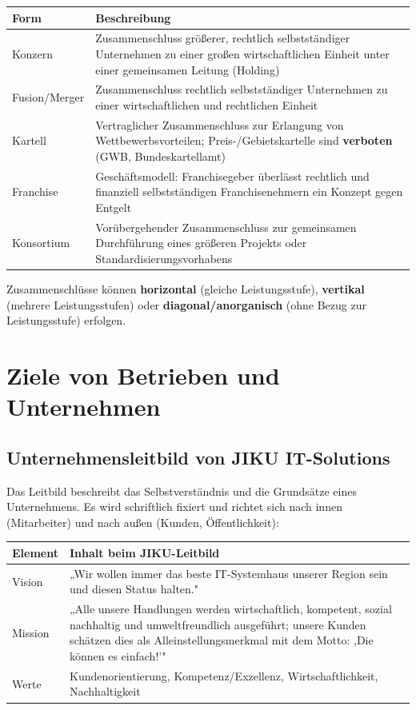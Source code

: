\documentclass[11pt, a4paper]{article}
\begin{document}
\begin{center}
\begin{tabular}{p{3.5cm} p{9.5cm}}
\toprule
\textbf{Form} & \textbf{Beschreibung}\\
\midrule
Konzern & Zusammenschluss größerer, rechtlich selbstständiger Unternehmen zu einer großen
wirtschaftlichen Einheit unter einer gemeinsamen Leitung (Holding)\\
Fusion/Merger & Zusammenschluss rechtlich selbstständiger Unternehmen zu einer
wirtschaftlichen und rechtlichen Einheit\\
Kartell & Vertraglicher Zusammenschluss zur Erlangung von Wettbewerbsvorteilen;
Preis-/Gebietskartelle sind \textbf{verboten} (GWB, Bundeskartellamt)\\
Franchise & Geschäftsmodell: Franchisegeber überlässt rechtlich und finanziell
selbstständigen Franchisenehmern ein Konzept gegen Entgelt\\
Konsortium & Vorübergehender Zusammenschluss zur gemeinsamen Durchführung eines
größeren Projekts oder Standardisierungsvorhabens\\
\bottomrule
\end{tabular}
\end{center}

Zusammenschlüsse können \textbf{horizontal} (gleiche Leistungsstufe), \textbf{vertikal} (mehrere
Leistungsstufen) oder \textbf{diagonal/anorganisch} (ohne Bezug zur Leistungsstufe) erfolgen.

\section{Ziele von Betrieben und Unternehmen}

\subsection{Unternehmensleitbild von JIKU IT-Solutions}

Das Leitbild beschreibt das Selbstverständnis und die Grundsätze eines Unternehmens. Es wird schriftlich
fixiert und richtet sich nach innen (Mitarbeiter) und nach außen (Kunden, Öffentlichkeit):

\begin{center}
\begin{tabular}{p{2.5cm} p{10.5cm}}
\toprule
\textbf{Element} & \textbf{Inhalt beim JIKU-Leitbild}\\
\midrule
Vision & „Wir wollen immer das beste IT-Systemhaus unserer Region sein und diesen Status halten."\\
Mission & „Alle unsere Handlungen werden wirtschaftlich, kompetent, sozial nachhaltig und umweltfreundlich
ausgeführt; unsere Kunden schätzen dies als Alleinstellungsmerkmal mit dem Motto: ,Die können es einfach!'"\\
Werte & Kundenorientierung, Kompetenz/Exzellenz, Wirtschaftlichkeit, Nachhaltigkeit\\
\bottomrule
\end{tabular}
\end{center}
\end{document}
